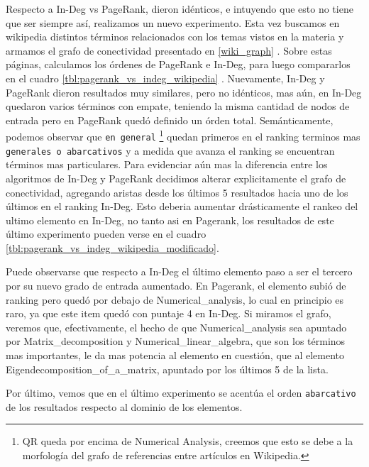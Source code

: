 Respecto a In-Deg vs PageRank, dieron idénticos, e intuyendo que esto no tiene que ser siempre
as\'i, realizamos un nuevo experimento. Esta vez buscamos en
wikipedia\cite{wikipedia} distintos t\'erminos relacionados con los temas vistos
en la materia y armamos el grafo de conectividad presentado en \ref{wiki_graph} . Sobre estas p\'aginas, calculamos los \'ordenes de PageRank e
In-Deg, para luego compararlos en el cuadro
\ref{tbl:pagerank_vs_indeg_wikipedia} . Nuevamente, In-Deg y PageRank dieron
resultados muy similares, pero no idénticos, mas aún, en In-Deg quedaron varios términos con empate, teniendo la misma cantidad de nodos de entrada pero en PageRank quedó definido un órden total. Semánticamente, podemos observar que \texttt{en general} \footnote{QR queda por encima de Numerical Analysis, creemos que esto se debe a la morfología del grafo de referencias entre artículos en Wikipedia.} quedan primeros en
el ranking terminos mas \texttt{generales o abarcativos} y a medida que avanza
el ranking se encuentran términos mas particulares. Para evidenciar aún mas la
diferencia entre los algoritmos de In-Deg y PageRank decidimos alterar
explicitamente el grafo de conectividad, agregando aristas desde los últimos 5
resultados hacia uno de los últimos en el ranking In-Deg. Esto deberia aumentar drásticamente el
rankeo del ultimo elemento en In-Deg, no tanto asi en Pagerank, los resultados de este
último experimento pueden verse en el cuadro
\ref{tbl:pagerank_vs_indeg_wikipedia_modificado}. 

Puede observarse que respecto a In-Deg el último elemento paso a ser el tercero por su nuevo grado de entrada aumentado. En Pagerank, el elemento subió de ranking pero quedó por debajo de Numerical\_analysis, lo cual en principio es raro, ya que este item quedó con puntaje 4 en In-Deg. Si miramos el grafo, veremos que, efectivamente, el hecho de que Numerical\_analysis sea apuntado por Matrix\_decomposition y Numerical\_linear\_algebra, que son los términos mas importantes, le da mas potencia al elemento en cuestión, que al elemento Eigendecomposition\_of\_a\_matrix, apuntado por los últimos 5 de la lista.

Por último, vemos que en el último experimento se acentúa el orden \texttt{abarcativo} de los resultados respecto al dominio de los elementos.

